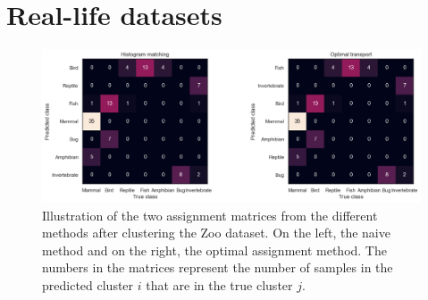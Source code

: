 \section{Real-life datasets}
\label{appendix:metrics_real}

\begin{figure}[H]
    \centering
    \includegraphics[width=\textwidth]{Attachments/assignment_method.png}
    \caption{Illustration of the two assignment matrices from the different methods after clustering the Zoo dataset. On the left, the naive method and on the right, the optimal assignment method.
    The numbers in the matrices represent the number of samples in the predicted cluster $i$ that are in the true cluster $j$.}
    \label{fig:assignment_methods}
\end{figure}

